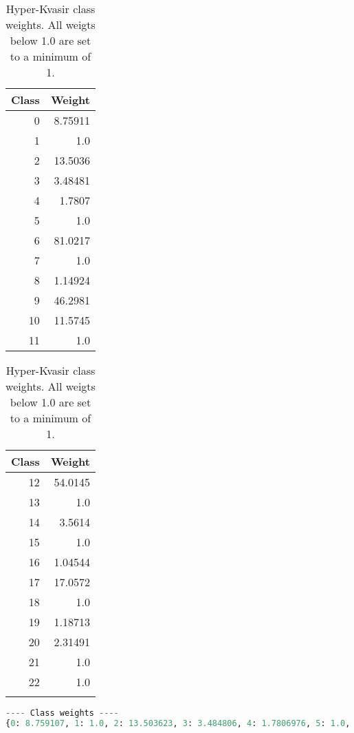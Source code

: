 \documentclass[thesis.tex]{subfiles}
\begin{document}
\begin{table} %
  \centering
  \begin{tabular}{rr}
	\hline
   Class &   Weight \\
	\hline
       0 &  8.75911 \\
       1 &  1.0     \\
       2 & 13.5036  \\
       3 &  3.48481 \\
       4 &  1.7807  \\
       5 &  1.0     \\
       6 & 81.0217  \\
       7 &  1.0     \\
       8 &  1.14924 \\
       9 & 46.2981  \\
      10 & 11.5745  \\
      11 &  1.0     \\
	\hline
  \end{tabular}
  \quad
  \begin{tabular}{rr}
	\hline
   Class &   Weight \\
	\hline
      12 & 54.0145  \\
      13 &  1.0     \\
      14 &  3.5614  \\
      15 &  1.0     \\
      16 &  1.04544 \\
      17 & 17.0572  \\
      18 &  1.0     \\
      19 &  1.18713 \\
      20 &  2.31491 \\
      21 &  1.0     \\
      22 &  1.0     \\
      & \\
	\hline
  \end{tabular}
  \caption[Hyper-Kvasir class weights]{Hyper-Kvasir class weights. All weigts below 1.0 are set to a minimum of 1.}
  \label{table:class_weights}
\end{table}

\begin{lstlisting}[language=Python]
---- Class weights ----
{0: 8.759107, 1: 1.0, 2: 13.503623, 3: 3.484806, 4: 1.7806976, 5: 1.0, 6: 81.021736, 7: 1.0, 8: 1.1492445, 9: 46.298138, 10: 11.574534, 11: 1.0, 12: 54.014492, 13: 1.0, 14: 3.5613952, 15: 1.0, 16: 1.0454417, 17: 17.057209, 18: 1.0, 19: 1.1871318, 20: 2.3149068, 21: 1.0, 22: 1.0}
\end{lstlisting}
\end{document}
